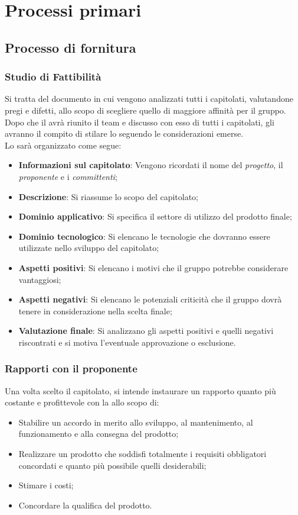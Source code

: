 \section{Processi primari}
\subsection{Processo di fornitura}

\subsubsection{Studio di Fattibilità}
Si tratta del documento in cui vengono analizzati tutti i capitolati, valutandone pregi e difetti, allo scopo di scegliere quello di maggiore affinità per il gruppo.
Dopo che il \RdP{} avrà riunito il team e discusso con esso di tutti i capitolati, gli \anas{} avranno il compito di stilare lo \SdF{} seguendo le considerazioni emerse.\\
Lo \SdF{} sarà organizzato come segue:
\begin{itemize}
	\item \textbf{Informazioni sul capitolato}:
	Vengono ricordati il nome del \emph{progetto}, il \textit{proponente} e i \textit{committenti};
	\item \textbf{Descrizione}:
	Si riassume lo scopo del capitolato;
	\item \textbf{Dominio applicativo}:
	Si specifica il settore di utilizzo del prodotto finale;
	\item \textbf{Dominio tecnologico}:
	Si elencano le tecnologie che dovranno essere utilizzate nello sviluppo del capitolato;
	\item \textbf{Aspetti positivi}:
	Si elencano i motivi che il gruppo potrebbe considerare vantaggiosi;
	\item \textbf{Aspetti negativi}:
	Si elencano le potenziali criticità che il gruppo dovrà tenere in considerazione nella scelta finale;
	\item \textbf{Valutazione finale}:
	Si analizzano gli aspetti positivi e quelli negativi riscontrati e si motiva l'eventuale approvazione o esclusione.
\end{itemize}

\subsubsection{Rapporti con il proponente}
Una volta scelto il capitolato, si intende instaurare un rapporto quanto più costante e profittevole con la \proponente{} allo scopo di:
\begin{itemize}
	\item Stabilire un accordo in merito allo sviluppo, al mantenimento, al funzionamento e alla consegna del prodotto;
	\item Realizzare un prodotto che soddisfi totalmente i requisiti obbligatori concordati e quanto più possibile quelli desiderabili;
	\item Stimare i costi;
	\item Concordare la qualifica del prodotto.
\end{itemize}

